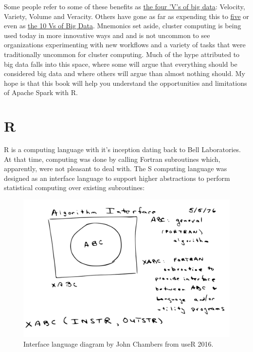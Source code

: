 \documentclass[]{book}
\theoremstyle{definition}
\theoremstyle{definition}
\theoremstyle{definition}
\theoremstyle{remark}
\begin{document}
Some people refer to some of these benefits as
\href{http://www.theserverside.com/feature/Handling-the-four-Vs-of-big-data-volume-velocity-variety-and-veracity}{the
four 'V's of big data}: Velocity, Variety, Volume and Veracity. Others
have gone as far as expending this to
\href{https://en.wikipedia.org/wiki/Big_data}{five} or even as
\href{https://tdwi.org/articles/2017/02/08/10-vs-of-big-data.aspx}{the
10 Vs of Big Data}. Mnemonics set aside, cluster computing is being used
today in more innovative ways and and is not uncommon to see
organizations experimenting with new workflows and a variety of tasks
that were traditionally uncommon for cluster computing. Much of the hype
attributed to big data falls into this space, where some will argue that
everything should be considered big data and where others will argue
than almost nothing should. My hope is that this book will help you
understand the opportunities and limitations of Apache Spark with R.

\hypertarget{r}{%
\section{R}\label{r}}

R is a computing language with it's inception dating back to Bell
Laboratories. At that time, computing was done by calling Fortran
subroutines which, apparently, were not pleasant to deal with. The S
computing language was designed as an interface language to support
higher abstractions to perform statistical computing over existing
subroutines:

\begin{figure}
\includegraphics[width=22.22in]{images/01-intro-s-algorithm-interface} \caption{Interface language diagram by John Chambers from useR 2016.}\label{fig:s-diagram}
\end{figure}
\end{document}
